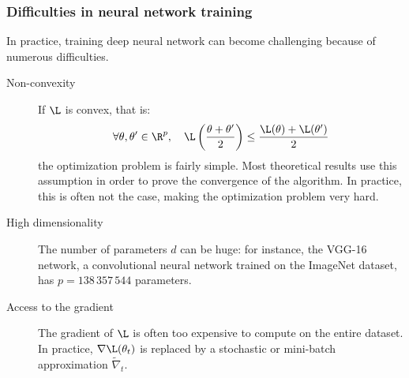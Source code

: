 \subsubsection{Difficulties in neural network training}
In practice, training deep neural network can become challenging because of numerous difficulties.
\begin{description}
    \item[Non-convexity] If $\L$ is convex, that is:
    \begin{equation*}
        \forall\theta,\theta'\in\R^p, \quad \L\left(\frac{\theta+\theta'}{2}\right) \leq \frac{\L(\theta)+\L(\theta')}{2}
    \end{equation*}
    the optimization problem is fairly simple. Most theoretical results use this assumption in order to prove the convergence of the algorithm. In practice, this is often not the case, making the optimization problem very hard.
    \item[High dimensionality] The number of parameters $d$ can be huge: for instance, the VGG-16 network, a convolutional neural network trained on the ImageNet dataset, has $p=138\,357\,544$ parameters.
    \item[Access to the gradient] The gradient of $\L$ is often too expensive to compute on the entire dataset. In practice, $\nabla\L(\theta_t)$ is replaced by a stochastic or mini-batch approximation $\tilde{\nabla}_t$. 
\end{description}

